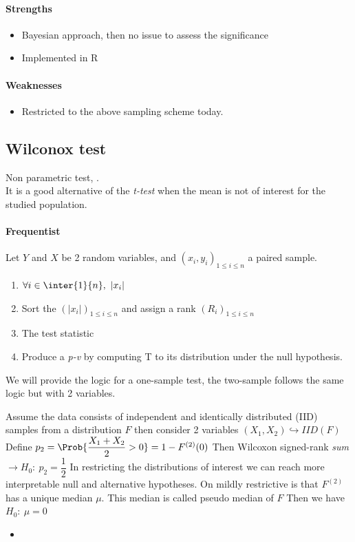 \paragraph{Strengths}
\begin{itemize}
    \item Bayesian approach, then no issue to assess the significance
    \item Implemented in R
\end{itemize}

\paragraph{Weaknesses}
\begin{itemize}
    \item Restricted to the above sampling scheme today. 
\end{itemize}


\subsection{Wilconox test}
Non parametric test, .\\
It is a good alternative of the \emph{t-test} when the mean is not of interest for the 
studied population.
\paragraph{Frequentist}
Let $Y$ and $X$ be 2 random variables, and $\left(x_{i}, y_{i}\right)_{1\leq i\leq n}$
a paired sample. 
\begin{enumerate}
    \item $\forall i\in\inter{1}{n},~\left|x_{i}\right|$
    \item Sort the $\left(\left|x_{i}\right|\right)_{1\leq i\leq n}$ and assign a rank
        $\left(R_{i}\right)_{1\leq i\leq n}$
    \item The test statistic 
    \item Produce a \emph{p-v} by computing T to its distribution under the null
        hypothesis.
\end{enumerate}
We will provide the logic for a one-sample test, the two-sample follows the same logic but
with 2 variables.

Assume the data consists of independent and identically distributed (IID) samples from a
distribution $F$ then consider 2 variables $(X_{1}, X_{2})\hookrightarrow IID(F)$
Define $p_{2} = \Prob{\dfrac{X_{1} + X_{2}}{2}>0} = 1-F^{(2)}(0)$
Then Wilcoxon signed-rank \emph{sum} $\rightarrow H_{0}:~p_{2} = \dfrac{1}{2}$
In restricting the distributions of interest we can reach more interpretable null and 
alternative hypotheses. On mildly restrictive is that $F^(2)$ has a unique median $\mu$. 
This median is called pseudo median of $F$
Then we have $H_{0}:~\mu=0$
\begin{itemize}
    \item  
\end{itemize}


